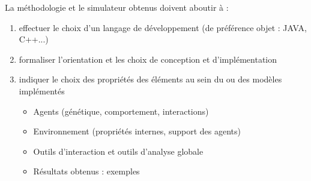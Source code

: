 \documentclass[11pt,twoside,a4paper]{article}
\begin{document}
La m{\'e}thodologie et le simulateur obtenus doivent aboutir {\`a} : 
\begin{enumerate}
	\item effectuer le choix d'un langage de d{\'e}veloppement (de pr{\'e}f{\'e}rence objet : JAVA, C++...)
	\item formaliser l'orientation et les choix de conception et d'impl{\'e}mentation
	\item indiquer le choix des propri{\'e}t{\'e}s des {\'e}l{\'e}ments au sein du ou des mod{\`e}les impl{\'e}ment{\'e}s
	\begin{itemize}
		\item Agents (g{\'e}n{\'e}tique, comportement, interactions)
		\item Environnement (propri{\'e}t{\'e}s internes, support des agents)
		\item Outils d'interaction et outils d'analyse globale
		\item R{\'e}sultats obtenus : exemples
	\end{itemize}
\end{enumerate}

\nocite{*}

\setcounter{page}{0}
\thispagestyle{empty}
\clearpage
\end{document}
